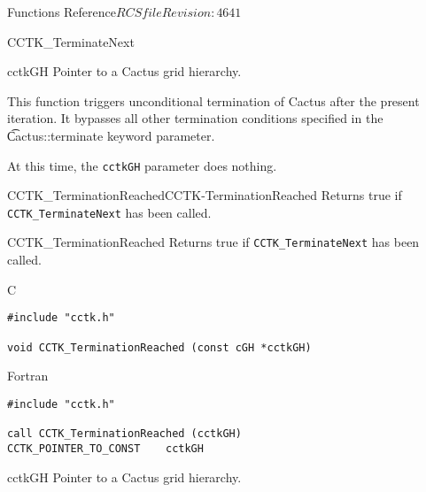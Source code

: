 \begin{cactuspart}{ Functions Reference}{$RCSfile$}{$Revision: 4641 $}
\begin{FunctionDescription}{CCTK\_TerminateNext}
\begin{ParameterSection}
\begin{Parameter}{cctkGH}
Pointer to a Cactus grid hierarchy.
\end{Parameter}
\end{ParameterSection}

\begin{Discussion}
This function triggers unconditional termination of Cactus after the
present iteration.
It bypasses all other termination conditions specified in the
{\t Cactus::terminate} keyword parameter.

At this time, the {\tt cctkGH} parameter does nothing.
\end{Discussion}
\begin{SeeAlsoSection}
\begin{SeeAlso2}{CCTK\_TerminationReached}{CCTK-TerminationReached}
  Returns true if {\tt CCTK\_TerminateNext} has been called.
\end{SeeAlso2}
\end{SeeAlsoSection}
\end{FunctionDescription}


\begin{FunctionDescription}{CCTK\_TerminationReached}
\label{CCTK-TerminationReached}
Returns true if {\tt CCTK\_TerminateNext} has been called.

\begin{SynopsisSection}
\begin{Synopsis}{C}
\begin{verbatim}
#include "cctk.h"

void CCTK_TerminationReached (const cGH *cctkGH)
\end{verbatim}
\end{Synopsis}
\begin{Synopsis}{Fortran}
\begin{verbatim}
#include "cctk.h"

call CCTK_TerminationReached (cctkGH)
CCTK_POINTER_TO_CONST    cctkGH
\end{verbatim}
\end{Synopsis}
\end{SynopsisSection}

\begin{ParameterSection}
\begin{Parameter}{cctkGH}
Pointer to a Cactus grid hierarchy.
\end{Parameter}
\end{ParameterSection}


\end{FunctionDescription}
\end{cactuspart}
